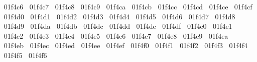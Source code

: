 {  ^^^^^^01f4c6%
  ^^^^^^01f4c7%
  ^^^^^^01f4c8%
  ^^^^^^01f4c9%
  ^^^^^^01f4ca%
  ^^^^^^01f4cb%
  ^^^^^^01f4cc%
  ^^^^^^01f4cd%
  ^^^^^^01f4ce%
  ^^^^^^01f4cf%
  ^^^^^^01f4d0%
  ^^^^^^01f4d1%
  ^^^^^^01f4d2%
  ^^^^^^01f4d3%
  ^^^^^^01f4d4%
  ^^^^^^01f4d5%
  ^^^^^^01f4d6%
  ^^^^^^01f4d7%
  ^^^^^^01f4d8%
  ^^^^^^01f4d9%
  ^^^^^^01f4da%
  ^^^^^^01f4db%
  ^^^^^^01f4dc%
  ^^^^^^01f4dd%
  ^^^^^^01f4de%
  ^^^^^^01f4df%
  ^^^^^^01f4e0%
  ^^^^^^01f4e1%
  ^^^^^^01f4e2%
  ^^^^^^01f4e3%
  ^^^^^^01f4e4%
  ^^^^^^01f4e5%
  ^^^^^^01f4e6%
  ^^^^^^01f4e7%
  ^^^^^^01f4e8%
  ^^^^^^01f4e9%
  ^^^^^^01f4ea%
  ^^^^^^01f4eb%
  ^^^^^^01f4ec%
  ^^^^^^01f4ed%
  ^^^^^^01f4ee%
  ^^^^^^01f4ef%
  ^^^^^^01f4f0%
  ^^^^^^01f4f1%
  ^^^^^^01f4f2%
  ^^^^^^01f4f3%
  ^^^^^^01f4f4%
  ^^^^^^01f4f5%
  ^^^^^^01f4f6%
}
